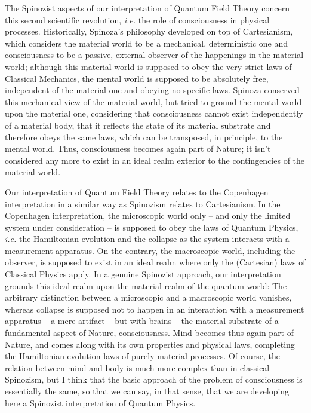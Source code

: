 The Spinozist aspects of our interpretation of Quantum Field Theory concern this second scientific revolution, \textit{i.e.} the role of consciousness in physical processes.
Historically, Spinoza's philosophy developed on top of Cartesianism, which considers the material world to be a mechanical, deterministic one and consciousness to be a passive, external observer of the happenings in the material world; although this material world is supposed to obey the very strict laws of Classical Mechanics, the mental world is supposed to be absolutely free, independent of the material one and obeying no specific laws.
Spinoza conserved this mechanical view of the material world, but tried to ground the mental world upon the material one, considering that consciousness cannot exist independently of a material body, that it reflects the state of its material substrate and therefore obeys the same laws, which can be transposed, in principle, to the mental world.
Thus, consciousness becomes again part of Nature; it isn't considered any more to exist in an ideal realm exterior to the contingencies of the material world.

Our interpretation of Quantum Field Theory relates to the Copenhagen interpretation in a similar way as Spinozism relates to Cartesianism.
In the Copenhagen interpretation, the microscopic world only -- and only the limited system under consideration -- is supposed to obey the laws of Quantum Physics, \textit{i.e.} the Hamiltonian evolution and the collapse as the system interacts with a measurement apparatus.
On the contrary, the macroscopic world, including the observer, is supposed to exist in an ideal realm where only the (Cartesian) laws of Classical Physics apply.
In a genuine Spinozist approach, our interpretation grounds this ideal realm upon the material realm of the quantum world: The arbitrary distinction between a microscopic and a macroscopic world vanishes, whereas collapse is supposed not to happen in an interaction with a measurement apparatus -- a mere artifact -- but with brains -- the material substrate of a fundamental aspect of Nature, consciousness.
Mind becomes thus again part of Nature, and comes along with its own properties and physical laws, completing the Hamiltonian evolution laws of purely material processes.
Of course, the relation between mind and body is much more complex than in classical Spinozism, but I think that the basic approach of the problem of consciousness is essentially the same, so that we can say, in that sense, that we are developing here a Spinozist interpretation of Quantum Physics.
